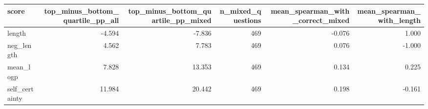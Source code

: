 \begin{tabular}{lrrrrr}
\toprule
score & top\_minus\_bottom\_quartile\_pp\_all & top\_minus\_bottom\_quartile\_pp\_mixed & n\_mixed\_questions & mean\_spearman\_with\_correct\_mixed & mean\_spearman\_with\_length \\
\midrule
length & -4.594 & -7.836 & 469 & -0.076 & 1.000 \\
neg\_length & 4.562 & 7.783 & 469 & 0.076 & -1.000 \\
mean\_logp & 7.828 & 13.353 & 469 & 0.134 & 0.225 \\
self\_certainty & 11.984 & 20.442 & 469 & 0.198 & -0.161 \\
\bottomrule
\end{tabular}
